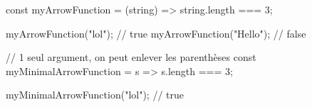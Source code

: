 const myArrowFunction = (string) => string.length === 3;

myArrowFunction("lol"); // true
myArrowFunction("Hello"); // false

// 1 seul argument, on peut enlever les parenthèses
const myMinimalArrowFunction = s => s.length === 3;

myMinimalArrowFunction("lol"); // true